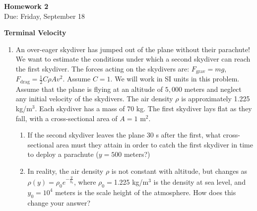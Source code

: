 \documentclass{article}
\begin{document}
\fancyfoot[C]{\thepage}
\vspace*{0cm}
\begin{center}
	{\LARGE \textbf{Homework 2}}\\
	\vspace{0.25cm}
	{\Large Due: Friday, September 18}
\end{center}

\newcommand{\textbook}{\textit{Giordano}}
{\large \textbf{Terminal Velocity} }
\begin{enumerate}
	\item An over-eager skydiver has jumped out of the plane without their parachute! We want to estimate the conditions under which a second skydiver can reach the first skydiver. The forces acting on the skydivers are: $F_\mathrm{grav}=mg$, $F_\mathrm{drag}=\frac{1}{2}C\rho A v^2$. Assume $C=1$. We will work in SI units in this problem. Assume that the plane is flying at an altitude of $5,000$ meters and neglect any initial velocity of the skydivers. The air density $\rho$ is approximately 1.225 kg/m$^3$. Each skydiver has a mass of 70 kg. The first skydiver lays flat as they fall, with a cross-sectional area of $A=1$ m$^2$. 
	\begin{enumerate}
		\item 	If the second skydiver leaves the plane 30 s after the first, what cross-sectional area must they attain in order to catch the first skydiver in time to deploy a parachute ($y=500$ meters?)
		\item In reality, the air density $\rho$ is not constant with altitude, but changes as $\rho(y) = \rho_0 e^{-\frac{y}{y_0}}$, where $\rho_0=$1.225 kg/m$^3$ is the density at sea level, and $y_0=10^4$ meters is the scale height of the atmosphere. How does this change your answer?
	\end{enumerate}


\end{enumerate}
\end{document}
